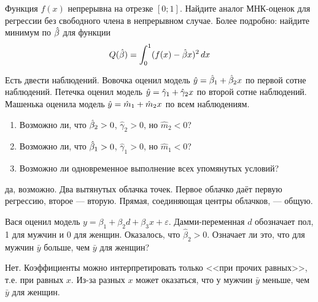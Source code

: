 \documentclass[pdftex,11pt,openany]{book}
\begin{document}
\begin{problem}
 Функция $f(x)$ непрерывна на отрезке $[0;1]$. Найдите аналог МНК-оценок для регрессии без свободного члена в непрерывном случае. Более подробно: найдите минимум по $\hat{\beta}$ для функции
\begin{equation}
Q(\hat{\beta})= \int_0^1 (f(x)-\hat{\beta} x)^2\,dx
\end{equation}
\end{problem}

\begin{solution}
\end{solution}


\begin{problem}
 Есть двести наблюдений. Вовочка оценил модель $\hat{y}=\hat{\beta}_1+\hat{\beta}_2 x$ по первой сотне наблюдений. Петечка оценил модель $\hat{y}=\hat{\gamma}_1+\hat{\gamma}_2 x$ по второй сотне наблюдений. Машенька оценила модель $\hat{y}=\hat{m}_1+\hat{m}_2 x$ по всем наблюдениям.
\begin{enumerate}
\item Возможно ли, что $\hat{\beta}_2>0$, $\hat{\gamma}_2>0$, но $\hat{m}_2<0$?
\item Возможно ли, что $\hat{\beta}_1>0$, $\hat{\gamma}_1>0$, но $\hat{m}_1<0$?
\item Возможно ли одновременное выполнение всех упомянутых условий?
\end{enumerate}
\end{problem}

\begin{solution}
да, возможно. Два вытянутых облачка точек. Первое облачко даёт первую регрессию, второе --- вторую. Прямая, соединяющая центры облачков, --- общую.
\end{solution}



\begin{problem}
 Вася оценил модель $y=\beta_1+\beta_2 d+\beta_3 x+\varepsilon$. Дамми-переменная $d$ обозначает пол, 1 для мужчин и 0 для женщин. Оказалось, что $\hat{\beta}_2>0$. Означает ли это, что для мужчин $\bar{y}$ больше, чем $\bar{y}$ для женщин?
\end{problem}

\begin{solution}
Нет. Коэффициенты можно интерпретировать только <<при прочих равных>>, т.е. при равных $x$. Из-за разных $x$ может оказаться, что у мужчин $\bar{y}$ меньше, чем $\bar{y}$ для женщин.
\end{solution}
\end{document}
